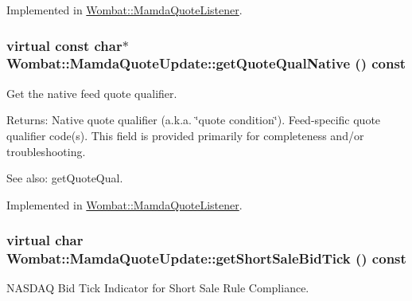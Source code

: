 Implemented in \hyperlink{classWombat_1_1MamdaQuoteListener_e33ca4e1fa76fb882185676c0d865be7}{Wombat::Mamda\-Quote\-Listener}.\hypertarget{classWombat_1_1MamdaQuoteUpdate_393d0fb442ac45348fdeb6a6cba2a7ac}{
\subsubsection[getQuoteQualNative]{\setlength{\rightskip}{0pt plus 5cm}virtual const char$\ast$ Wombat::Mamda\-Quote\-Update::get\-Quote\-Qual\-Native () const}}
\label{classWombat_1_1MamdaQuoteUpdate_393d0fb442ac45348fdeb6a6cba2a7ac}


Get the native feed quote qualifier. 

\begin{Desc}
\item[Returns:]Native quote qualifier (a.k.a. \char`\"{}quote condition\char`\"{}). Feed-specific quote qualifier code(s). This field is provided primarily for completeness and/or troubleshooting. \end{Desc}
\begin{Desc}
\item[See also:]get\-Quote\-Qual. \end{Desc}


Implemented in \hyperlink{classWombat_1_1MamdaQuoteListener_b7ff05baca5f30eb44a863e2bed6ce1b}{Wombat::Mamda\-Quote\-Listener}.\hypertarget{classWombat_1_1MamdaQuoteUpdate_d57b32bde2b0fc0bbf5e28074112c0d8}{
\subsubsection[getShortSaleBidTick]{\setlength{\rightskip}{0pt plus 5cm}virtual char Wombat::Mamda\-Quote\-Update::get\-Short\-Sale\-Bid\-Tick () const}}
\label{classWombat_1_1MamdaQuoteUpdate_d57b32bde2b0fc0bbf5e28074112c0d8}


NASDAQ Bid Tick Indicator for Short Sale Rule Compliance. 

